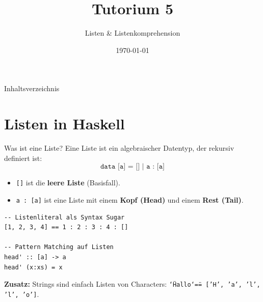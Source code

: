 \documentclass[aspectratio=169,11pt]{beamer}
\title{\textbf{Tutorium 5}}
\subtitle{Listen \& Listenkomprehension}
\institute{Grundlagen der Praktischen Informatik}
\author{}
\date{\today}
\begin{document}
\begin{frame}[plain]
    \titlepage
\end{frame}

\begin{frame}{Inhaltsverzeichnis}
    \tableofcontents
\end{frame}

\section{Listen in Haskell}

\begin{frame}[fragile]{Was ist eine Liste?}
    Eine Liste ist ein algebraischer Datentyp, der rekursiv definiert ist:
    \[ \texttt{data [a] = [] | a : [a]} \]
    
    \begin{itemize}
        \item \texttt{[]} ist die \textbf{leere Liste} (Basisfall).
        \item \texttt{a : [a]} ist eine Liste mit einem \textbf{Kopf (Head)} und einem \textbf{Rest (Tail)}.
    \end{itemize}
    
    \begin{tcolorbox}[modernbox, title=Beispiel: Listenaufbau]
\begin{lstlisting}
-- Listenliteral als Syntax Sugar
[1, 2, 3, 4] == 1 : 2 : 3 : 4 : []

-- Pattern Matching auf Listen
head' :: [a] -> a
head' (x:xs) = x
\end{lstlisting}
    \end{tcolorbox}
    \small \textbf{Zusatz:} Strings sind einfach Listen von Characters: \texttt{\char`\"Hallo\char`\" == ['H', 'a', 'l', 'l', 'o']}.
\end{frame}
\end{document}
